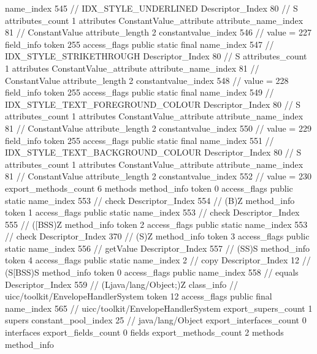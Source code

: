 {{{{{				name_index	545		// IDX_STYLE_UNDERLINED
				Descriptor_Index	80		// S
				attributes_count	1
				attributes {
				ConstantValue_attribute {
					attribute_name_index	81		// ConstantValue
					attribute_length	2
					constantvalue_index	546		// value = 227
				}
				}
			}
			field_info {
				token	255
				access_flags	public static final
				name_index	547		// IDX_STYLE_STRIKETHROUGH
				Descriptor_Index	80		// S
				attributes_count	1
				attributes {
				ConstantValue_attribute {
					attribute_name_index	81		// ConstantValue
					attribute_length	2
					constantvalue_index	548		// value = 228
				}
				}
			}
			field_info {
				token	255
				access_flags	public static final
				name_index	549		// IDX_STYLE_TEXT_FOREGROUND_COLOUR
				Descriptor_Index	80		// S
				attributes_count	1
				attributes {
				ConstantValue_attribute {
					attribute_name_index	81		// ConstantValue
					attribute_length	2
					constantvalue_index	550		// value = 229
				}
				}
			}
			field_info {
				token	255
				access_flags	public static final
				name_index	551		// IDX_STYLE_TEXT_BACKGROUND_COLOUR
				Descriptor_Index	80		// S
				attributes_count	1
				attributes {
				ConstantValue_attribute {
					attribute_name_index	81		// ConstantValue
					attribute_length	2
					constantvalue_index	552		// value = 230
				}
				}
			}
			}
			export_methods_count	6
			methods {
				method_info {
					token	0
					access_flags	public static
					name_index	553		// check
					Descriptor_Index	554		// (B)Z
				}
				method_info {
					token	1
					access_flags	public static
					name_index	553		// check
					Descriptor_Index	555		// ([BSS)Z
				}
				method_info {
					token	2
					access_flags	public static
					name_index	553		// check
					Descriptor_Index	370		// (S)Z
				}
				method_info {
					token	3
					access_flags	public static
					name_index	556		// getValue
					Descriptor_Index	557		// (SS)S
				}
				method_info {
					token	4
					access_flags	public static
					name_index	2		// copy
					Descriptor_Index	12		// (S[BSS)S
				}
				method_info {
					token	0
					access_flags	public
					name_index	558		// equals
					Descriptor_Index	559		// (Ljava/lang/Object;)Z
				}
			}
		}
		class_info {		// uicc/toolkit/EnvelopeHandlerSystem
			token	12
			access_flags	public final
			name_index	565		// uicc/toolkit/EnvelopeHandlerSystem
			export_supers_count	1
			supers {
				constant_pool_index	25		// java/lang/Object
			}
			export_interfaces_count	0
			interfaces {
			}
			export_fields_count	0
			fields {
			}
			export_methods_count	2
			methods {
				method_info {
}}}}}
